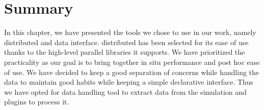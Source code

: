 \section{Summary}
In this chapter, we have presented the tools we chose to use in our work, namely \dask distributed and \pdi data interface.
\dask distributed has been selected for its ease of use thanks to the high-level parallel libraries it supports. We have prioritized the practicality as our goal is to bring together in situ performance and post hoc ease of use.
We have decided to keep a good separation of concerns while handling the data to maintain good habits while keeping a simple declarative interface. Thus we have opted for \pdi data handling tool to extract data from the simulation and \pdi plugins to process it. 